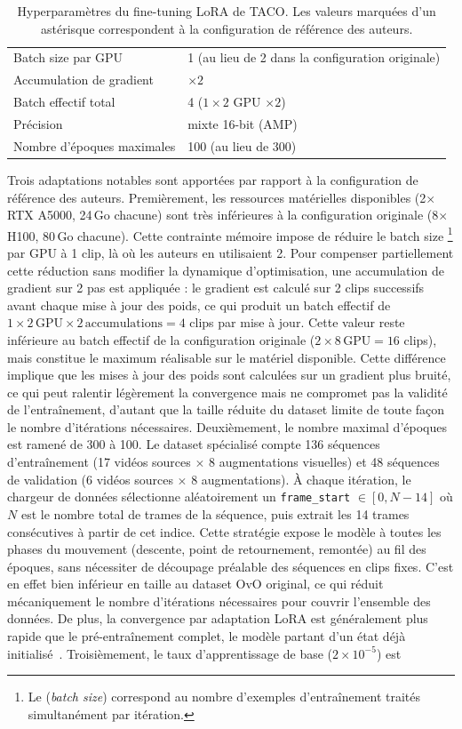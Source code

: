 \begin{table}[h]
\begin{tabular}{ll}
    Batch size par GPU & 1 (au lieu de 2 dans la configuration originale) \\
    Accumulation de gradient & $\times 2$ \\
    Batch effectif total & 4 ($1 \times 2$ GPU $\times 2$) \\
    Précision & mixte 16-bit (AMP) \\
    Nombre d'époques maximales & 100 (au lieu de 300) \\
    \hline
  \end{tabular}
  \caption{Hyperparamètres du fine-tuning LoRA de TACO. Les valeurs marquées d'un astérisque correspondent à la configuration de référence des auteurs.}
  \label{tab:hyperparams}
\end{table}

Trois adaptations notables sont apportées par rapport à la configuration de référence des auteurs. Premièrement, les ressources matérielles disponibles (2$\times$RTX A5000, 24\,Go chacune) sont très inférieures à la configuration originale (8$\times$H100, 80\,Go chacune). Cette contrainte mémoire impose de réduire le batch size \footnote{Le (\textit{batch size}) correspond au nombre d'exemples d'entraînement traités simultanément par itération.} par GPU à 1 clip, là où les auteurs en utilisaient 2. Pour compenser partiellement cette réduction sans modifier la dynamique d'optimisation, une accumulation de gradient sur 2 pas est appliquée : le gradient est calculé sur 2 clips successifs avant chaque mise à jour des poids, ce qui produit un batch effectif de $1 \times 2\,\text{GPU} \times 2\,\text{accumulations} = 4$ clips par mise à jour. Cette valeur reste inférieure au batch effectif de la configuration originale ($2 \times 8\,\text{GPU} = 16$ clips), mais constitue le maximum réalisable sur le matériel disponible. Cette différence implique que les mises à jour des poids sont calculées sur un gradient plus bruité, ce qui peut ralentir légèrement la convergence mais ne compromet pas la validité de l'entraînement, d'autant que la taille réduite du dataset limite de toute façon le nombre d'itérations nécessaires. Deuxièmement, le nombre maximal d'époques est ramené de 300 à 100. Le dataset spécialisé compte 136 séquences d'entraînement (17 vidéos sources $\times$ 8 augmentations visuelles) et 48 séquences de validation (6 vidéos sources $\times$ 8 augmentations). À chaque itération, le chargeur de données sélectionne aléatoirement un \texttt{frame\_start} $\in [0, N - 14]$ où $N$ est le nombre total de trames de la séquence, puis extrait les 14 trames consécutives à partir de cet indice. Cette stratégie expose le modèle à toutes les phases du mouvement (descente, point de retournement, remontée) au fil des époques, sans nécessiter de découpage préalable des séquences en clips fixes. C'est en effet bien inférieur en taille au dataset OvO original, ce qui réduit mécaniquement le nombre d'itérations nécessaires pour couvrir l'ensemble des données. De plus, la convergence par adaptation LoRA est généralement plus rapide que le pré-entraînement complet, le modèle partant d'un état déjà initialisé~\cite{LoRA-2021}. Troisièmement, le taux d'apprentissage de base ($2 \times 10^{-5}$) est 